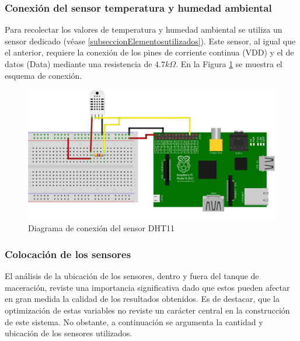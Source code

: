    \subsubsection{Conexión del sensor temperatura y humedad ambiental}
        \par Para recolectar los valores de temperatura y humedad ambiental se utiliza un sensor dedicado (véase \ref{subseccionElementosutilizados}). Este sensor, al igual que el anterior, requiere la conexión de los pines de corriente continua (VDD) y el de datos (Data) mediante una resistencia de $4.7k\Omega$. En la Figura \ref{fig:EsquemaDHT11} se muestra el esquema de conexión.
        \begin{figure}
            \centering
            \includegraphics[scale = 0.8]{DiagramaSensorDHT11_bb.jpg}
            \caption{Diagrama de conexión del sensor DHT11}
            \label{fig:EsquemaDHT11}
        \end{figure}
    
    \subsubsection{Colocación de los sensores}
    \label{colocacionDeSensores}
    El análisis de la ubicación de los sensores, dentro y fuera del tanque de maceración, reviste una importancia significativa dado que estos pueden afectar en gran medida la calidad de los resultados obtenidos. Es de destacar, que la optimización de estas variables no reviste un carácter central en la construcción de este sistema. No obstante, a continuación se argumenta la cantidad y ubicación de los sensores utilizados.
    

